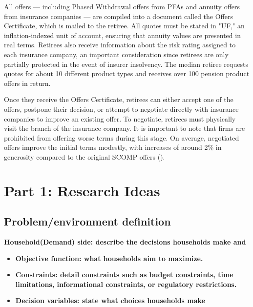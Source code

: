\documentclass[12pt]{article}
\theoremstyle{plain}
\theoremstyle{plain}
\begin{document}
All offers — including Phased Withdrawal offers from PFAs and annuity offers from insurance companies — are compiled into a  document called the Offers Certificate, which is mailed to the retiree. All quotes must be stated in "UF," an inflation-indexed unit of account, ensuring that annuity values are presented in real terms. Retirees also receive information about the risk rating assigned to each insurance company, an important consideration since retirees are only partially protected in the event of insurer insolvency. The median retiree  requests quotes for about 10 different product types and receives over 100 pension product offers in return.


Once they receive the Offers Certificate, retirees can either accept one of the offers, postpone their decision, or attempt to negotiate directly with insurance companies to improve an existing offer. To negotiate, retirees must physically visit the branch of the insurance company. It is important to note that firms are prohibited from offering worse terms during this stage. On average, negotiated offers improve the initial terms modestly, with increases of around 2\% in generosity compared to the original SCOMP offers (\cite{illanes_retirement_2019}).

\section{ Part 1: Research Ideas} 


\subsection{Problem/environment definition }

\textbf{Household(Demand) side:  describe the decisions households make and}
 
 \begin{itemize}
     \item \textbf{Objective function:  what households aim to maximize.  }

    \item \textbf{Constraints:  detail constraints such as budget constraints, time limitations, informational constraints, or regulatory restrictions. }

    \item \textbf{Decision variables: state what choices households make}

 \end{itemize}
\end{document}
